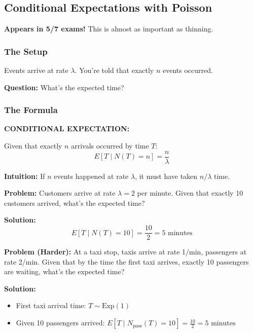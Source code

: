\documentclass[10pt,letterpaper]{article}
\begin{document}
\subsection{Conditional Expectations with Poisson}

\begin{criticalbox}
\textbf{Appears in 5/7 exams!} This is almost as important as thinning.
\end{criticalbox}

\subsubsection{The Setup}

Events arrive at rate $\lambda$. You're told that exactly $n$ events occurred.

\textbf{Question:} What's the expected time?

\subsubsection{The Formula}

\begin{formulabox}[colback=yellow!20,colframe=orange!80]
\textbf{CONDITIONAL EXPECTATION:}

Given that exactly $n$ arrivals occurred by time $T$:
\[
\boxed{E[T \mid N(T) = n] = \frac{n}{\lambda}}
\]

\textbf{Intuition:} If $n$ events happened at rate $\lambda$, it must have taken $n/\lambda$ time.
\end{formulabox}

\begin{examplebox}
\textbf{Problem:} Customers arrive at rate $\lambda = 2$ per minute. Given that exactly 10 customers arrived, what's the expected time?

\textbf{Solution:}
\[
E[T \mid N(T) = 10] = \frac{10}{2} = \boxed{5 \text{ minutes}}
\]

\textbf{Problem (Harder):} At a taxi stop, taxis arrive at rate 1/min, passengers at rate 2/min. Given that by the time the first taxi arrives, exactly 10 passengers are waiting, what's the expected time?

\textbf{Solution:}
\begin{itemize}
  \item First taxi arrival time: $T \sim \text{Exp}(1)$
  \item Given 10 passengers arrived: $E[T \mid N_{\text{pass}}(T) = 10] = \frac{10}{2} = \boxed{5 \text{ minutes}}$
\end{itemize}
\end{examplebox}
\end{document}
